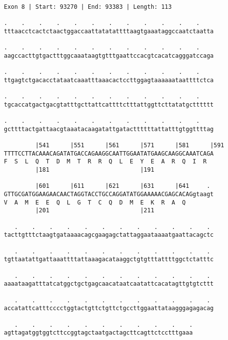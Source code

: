 \documentclass{article}
\begin{document}
\begin{Verbatim}
Exon 8 | Start: 93270 | End: 93383 | Length: 113
 
.    .    .    .    .    .    .    .    .    .    .    .    
tttaacctcactctaactggaccaattatatattttaagtgaaataggccaatctaatta
  
.    .    .    .    .    .    .    .    .    .    .    .    
aagccacttgtgactttggcaaataagtgtttgaattccacgtcacatcagggatccaga
  
.    .    .    .    .    .    .    .    .    .    .    .    
ttgagtctgacacctataatcaaatttaaacactccttggagtaaaaaataattttctca
  
.    .    .    .    .    .    .    .    .    .    .    .    
tgcaccatgactgacgtatttgcttattcattttctttattggttcttatatgctttttt
  
.    .    .    .    .    .    .    .    .    .    .    .    
gcttttactgattaacgtaaatacaagatattgatacttttttattatttgtggttttag
  
         |541      |551      |561      |571      |581      |591
TTTTCCTTACAAACAGATATGACCAGAAGGCAATTGGAATATGAAGCAAGGCAAATCAGA
F  S  L  Q  T  D  M  T  R  R  Q  L  E  Y  E  A  R  Q  I  R  
         |181                          |191                 
  
         |601      |611      |621      |631      |641     . 
GTTGCGATGGAAGAACAACTAGGTACCTGCCAGGATATGGAAAAACGAGCACAGgtaagt
V  A  M  E  E  Q  L  G  T  C  Q  D  M  E  K  R  A  Q        
         |201                          |211                 
  
   .    .    .    .    .    .    .    .    .    .    .    . 
tacttgtttctaagtgataaaacagcgaagagctattaggaataaaatgaattacagctc
  
   .    .    .    .    .    .    .    .    .    .    .    . 
tgttaatattgattaaattttattaaagacataaggctgtgtttattttggctctatttc
  
   .    .    .    .    .    .    .    .    .    .    .    . 
aaaataagatttatcatggctgctgagcaacataatcaatattcacatagttgtgtcttt
  
   .    .    .    .    .    .    .    .    .    .    .    . 
accatattcatttcccctggtactgttctgttctgccttggaattataagggagagacag
  
   .    .    .    .    .    .    .    .    .    .    .
agttagatggtggtcttccggtagctaatgactagcttcagttctcctttgaaa
\end{Verbatim}
\newpage
\end{document}
